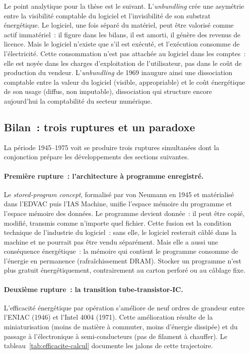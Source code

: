 %
Le point analytique pour la thèse est le suivant. L'\emph{unbundling} crée une asymétrie entre la visibilité comptable du logiciel et l'invisibilité de son substrat énergétique. Le logiciel, une fois séparé du matériel, peut être valorisé comme actif immatériel~: il figure dans les bilans, il est amorti, il génère des revenus de licence. Mais le logiciel n'existe que s'il est exécuté, et l'exécution consomme de l'électricité. Cette consommation n'est pas attachée au logiciel dans les comptes~: elle est noyée dans les charges d'exploitation de l'utilisateur, pas dans le coût de production du vendeur. L'\emph{unbundling} de 1969 inaugure ainsi une dissociation comptable entre la valeur du logiciel (visible, appropriable) et le coût énergétique de son usage (diffus, non imputable), dissociation qui structure encore aujourd'hui la comptabilité du secteur numérique.


\subsection{Bilan~: trois ruptures et un paradoxe}\label{subsec:bilan_computing}

%
La période 1945--1975 voit se produire trois ruptures simultanées dont la conjonction prépare les développements des sections suivantes.

\paragraph{Première rupture~: l'architecture à programme enregistré.} Le \emph{stored-program concept}, formalisé par von Neumann en 1945 et matérialisé dans l'EDVAC puis l'IAS Machine, unifie l'espace mémoire du programme et l'espace mémoire des données. Le programme devient donnée~: il peut être copié, modifié, transmis comme n'importe quel fichier. Cette fusion est la condition technique de l'industrie du logiciel~: sans elle, le logiciel resterait câblé dans la machine et ne pourrait pas être vendu séparément. Mais elle a aussi une conséquence énergétique~: la mémoire qui contient le programme consomme de l'énergie en permanence (rafraîchissement DRAM). Stocker un programme n'est plus gratuit énergétiquement, contrairement au carton perforé ou au câblage fixe.

\paragraph{Deuxième rupture~: la transition tube-transistor-IC.} L'efficacité énergétique par opération s'améliore de neuf ordres de grandeur entre l'ENIAC (1946) et l'Intel 4004 (1971). Cette amélioration résulte de la miniaturisation (moins de matière à commuter, moins d'énergie dissipée) et du passage à l'électronique à semi-conducteurs (pas de filament à chauffer). Le tableau~\ref{tab:efficacite-calcul} documente les jalons de cette trajectoire.

